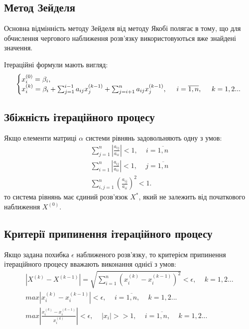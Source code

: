 \documentclass{article}
\begin{document}
\begin{large}
		\subsection*{Метод Зейделя}
		Основна відмінність методу Зейделя від методу Якобі полягає в тому, що для обчислення чергового наближення розв’язку використовуються вже знайдені значення.
		
		Ітераційні формули мають вигляд:
		\begin{gather}
			\left\{\begin{array}{@{}l@{}}
				x_i^{(0)}=\beta_i,\\\nonumber
				x_i^{(k)}=\beta_i+\sum_{j=1}^{i-1}a_{ij}x_j^{(k-1)}+\sum_{j=i+1}^{n}a_{ij}x_j^{(k-1)},\hspace{14pt}i=\overline{1,n}, \hspace{14pt}k=1,2...\nonumber
			\end{array}\right.\,
		\end{gather}
		
		\subsection*{Збіжність ітераційного процесу}
		Якщо елементи матриці $\alpha$ системи рівнянь задовольняють одну з умов:
		\begin{gather}\nonumber
			\sum_{j=1}^{n}|\frac{a_{ij}}{a_{ii}}|<1,\hspace{14pt} i=\overline{1,n}\\\nonumber
			\sum_{i=1}^{n}|\frac{a_{ij}}{a_{ii}}|<1,\hspace{14pt} j=\overline{1,n}\\\nonumber
			\sum_{i,j=1}^{n}(\frac{a_{ij}}{a_{ii}})^2<1.\nonumber
		\end{gather}
		то система рівнянь має єдиний розв'язок $X^*$, який не залежить від
		початкового наближення $X^{(0)}$.
		
		\subsection*{Критерії припинення ітераційного процесу}
		Якщо задана похибка $\epsilon$ наближеного розв’язку, то критерієм припинення
		ітераційного процесу вважають виконання однієї з умов:
		\begin{gather}\nonumber
			|X^{(k)}-X^{(k-1)}|=\sqrt{\sum_{i=1}^{n}(x_i^{(k)}-x_i^{(k-1)})^2}<\epsilon,\hspace{14pt}k=1,2...\\\nonumber
			max|x_i^{(k)}-x_i^{(k-1)}|<\epsilon,\hspace{14pt}i=\overline{1,n},\hspace{14pt}k=1,2...\\\nonumber
			max|\frac{x_i^{(k)}-x_i^{(k-1)}}{x_i^{(k)}}|<\epsilon,\hspace{14pt}|x_i|>>1,\hspace{14pt}i=\overline{1,n},\hspace{14pt}k=1,2...
		\end{gather}
		

\end{large}
\end{document}
